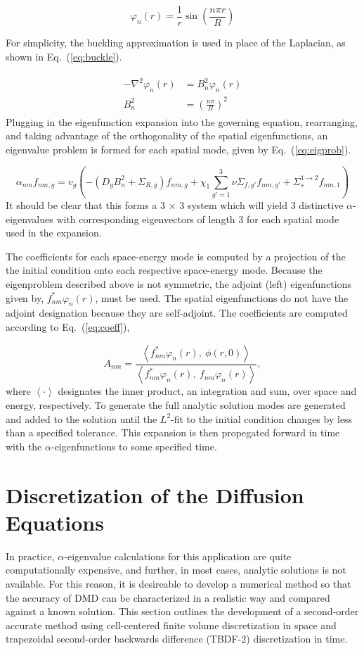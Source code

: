 \documentclass[12pt]{article}
\newcommand{\fn}[1]{\left( #1 \right)}
\newcommand{\ave}[1]{\left\langle #1 \right\rangle}
\newcommand{\bea}{\begin{eqnarray}}
\newcommand{\eea}{\end{eqnarray}}
\newcommand{\be}{\begin{equation}}
\newcommand{\ee}{\end{equation}}
\newcommand{\LEQ}[1]{\label{eq:#1}}
\newcommand{\EQ}[1]{Eq.~(\ref{eq:#1})}
\begin{document}
\be
	\varphi_n(r) = \frac{1}{r} \sin\fn{ \frac{n \pi r}{R} }
	\LEQ{eigfunc}
\ee

For simplicity, the buckling approximation is used in place of the Laplacian, 
 as shown in \EQ{buckle}.

\bea 
	\begin{aligned}
		- \nabla^2 \varphi_n(r) &= B_n^2 \varphi_n(r) \\
	 	B_n^2 &= \fn{ \frac{n \pi}{R} }^2
	\end{aligned} 
	\LEQ{buckle} 
\eea
Plugging in the eigenfunction expansion into the governing equation, 
 rearranging, and taking advantage of the orthogonality of the spatial 
 eigenfunctions, an eigenvalue problem is formed for each spatial mode, given by \EQ{eigprob}.

\be
	\alpha_{nm} f_{nm, g} = v_g \fn{ - \fn{ D_g B_n^2 + \Sigma_{R,g} }f_{nm, g} 
		+ \chi_1 \sum_{g' = 1}^{3} \nu\Sigma_{f,g'} f_{nm, g'} 
		+ \Sigma_s^{1 \rightarrow 2} f_{nm, 1} } 
	\LEQ{eigprob}
\ee
It should be clear that this forms a 3 $\times$ 3 system which will yield 3 
 distinctive $\alpha$-eigenvalues with corresponding eigenvectors of length 3 
 for each spatial mode used in the expansion.

The coefficients for each space-energy mode is computed by a projection of the 
 the initial condition onto each respective space-energy mode. 
Because the eigenproblem described above is not symmetric, the adjoint (left) 
 eigenfunctions given by, $f_{nm}^* \varphi_n(r)$, must be used. 
The spatial eigenfunctions do not have the adjoint designation because they are self-adjoint. 
The coefficients are computed according to \EQ{coeff},

\be
	A_{nm} = \frac{\ave{ f_{nm}^* \varphi_n(r), \ \phi(r, 0)}}{\ave{f_{nm}^* 	
			\varphi_n(r), \ f_{nm} \varphi_n(r)}},
	\LEQ{coeff} 
\ee
where $\ave{\cdot}$ designates the inner product, an integration and sum, over 
 space and energy, respectively. 
To generate the full analytic solution modes are generated and added to the 
 solution until the $L^2$-fit to the initial condition changes by less than a specified tolerance. 
This expansion is then propegated forward in time with the 
 $\alpha$-eigenfunctions to some specified time.

\section{Discretization of the Diffusion Equations}
In practice,  $\alpha$-eigenvalue calculations for this application are quite 
 computationally expensive, and  further, in most cases, analytic solutions is not available. 
For this reason, it is desireable to develop a numerical method so that the 
 accuracy of DMD can be characterized in a realistic way and compared against a known solution. 
This section outlines the development of a second-order accurate method using 
 cell-centered finite volume discretization in space and trapezoidal 
 second-order backwards difference (TBDF-2) discretization in time.
\end{document}
